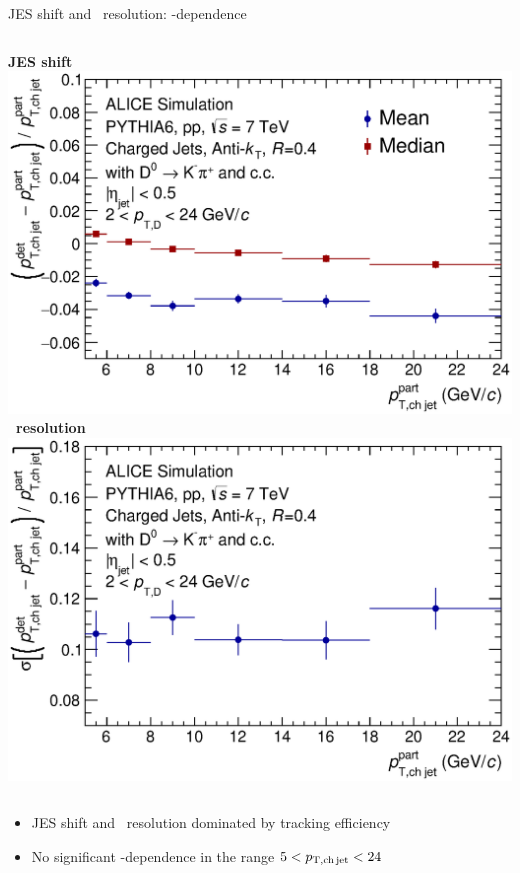 \documentclass[xcolor={usenames,dvipsnames}]{beamer}
\begin{document}
\begin{frame}{JES shift and \pt\ resolution: \pt-dependence}
\begin{columns}
\centering
\textbf{JES shift}\\
\includegraphics[width=\textwidth]{img/HQ16_Simulation_EnergyScaleShift}
\centering
\textbf{\ptchjet\ resolution} \\
\includegraphics[width=\textwidth]{img/HQ16_Simulation_Resolution}
\end{columns}
\medskip
\begin{itemize}
\item JES shift and \ptchjet\ resolution dominated by \alert{tracking efficiency}
\item \alert{No significant \pt-dependence} in the range $5<p_{\mathrm{T,ch\, jet}}<24$ \GeVc
\end{itemize}
\end{frame}
\end{document}
